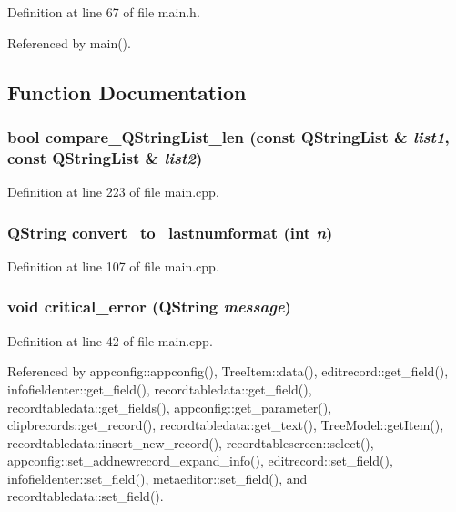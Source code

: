 Definition at line 67 of file main.h.

Referenced by main().

\subsection{Function Documentation}
\subsubsection{\setlength{\rightskip}{0pt plus 5cm}bool compare\_\-QString\-List\_\-len (const QString\-List \& {\em list1}, const QString\-List \& {\em list2})}\label{main_8h_4b9267e7db7804b40590ebb0aae4c257}




Definition at line 223 of file main.cpp.
\subsubsection{\setlength{\rightskip}{0pt plus 5cm}QString convert\_\-to\_\-lastnumformat (int {\em n})}\label{main_8h_ec163ac31ec8c8183dc05762ecb4281d}




Definition at line 107 of file main.cpp.
\subsubsection{\setlength{\rightskip}{0pt plus 5cm}void critical\_\-error (QString {\em message})}\label{main_8h_fe5e42a76086b3d9d2912f0c17ef0e59}




Definition at line 42 of file main.cpp.

Referenced by appconfig::appconfig(), Tree\-Item::data(), editrecord::get\_\-field(), infofieldenter::get\_\-field(), recordtabledata::get\_\-field(), recordtabledata::get\_\-fields(), appconfig::get\_\-parameter(), clipbrecords::get\_\-record(), recordtabledata::get\_\-text(), Tree\-Model::get\-Item(), recordtabledata::insert\_\-new\_\-record(), recordtablescreen::select(), appconfig::set\_\-addnewrecord\_\-expand\_\-info(), editrecord::set\_\-field(), infofieldenter::set\_\-field(), metaeditor::set\_\-field(), and recordtabledata::set\_\-field().

